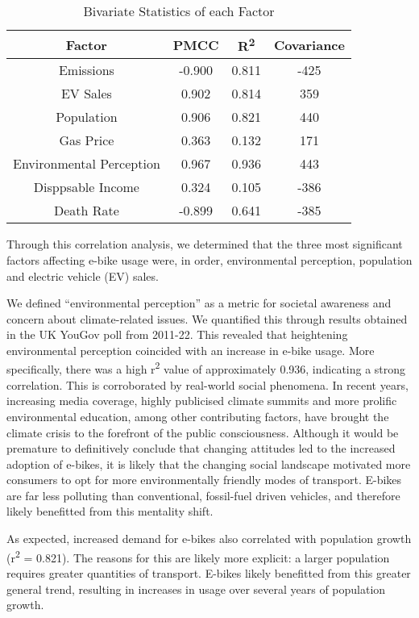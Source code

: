 \begin{table}[h!]
    \centering
    \caption{Bivariate Statistics of each Factor}
    \begin{tabular}{cccc}
        \toprule
        Factor & PMCC & R\textsuperscript{2} & Covariance      \\
        \midrule
        Emissions   & -0.900 & 0.811 & -425    \\
        EV Sales & 0.902 & 0.814 & 359     \\
        Population & 0.906 & 0.821 & 440 \\
        Gas Price & 0.363 & 0.132 & 171 \\
        Environmental Perception & 0.967 & 0.936 & 443 \\
        Disppsable Income & 0.324 & 0.105 & -386 \\
        Death Rate & -0.899 & 0.641 & -385 \\
        \bottomrule
    \end{tabular}
    \label{tab:factor_bivar}
\end{table}

Through this correlation analysis, we determined that the three most significant factors affecting e-bike usage were, in order, environmental perception, population and electric vehicle (EV) sales.

We defined ``environmental perception'' as a metric for societal awareness and concern about climate-related issues. We quantified this through results obtained in the UK YouGov poll from 2011-22. This revealed that heightening environmental perception coincided with an increase in e-bike usage. More specifically, there was a high r\textsuperscript{2} value of approximately 0.936, indicating a strong correlation. This is corroborated by real-world social phenomena. In recent years, increasing media coverage, highly publicised climate summits and more prolific environmental education, among other contributing factors, have brought the climate crisis to the forefront of the public consciousness. Although it would be premature to definitively conclude that changing attitudes led to the increased adoption of e-bikes, it is likely that the changing social landscape motivated more consumers to opt for more environmentally friendly modes of transport. E-bikes are far less polluting than conventional, fossil-fuel driven vehicles, and therefore likely benefitted from this mentality shift.

As expected, increased demand for e-bikes also correlated with population growth (r\textsuperscript{2} = 0.821). The reasons for this are likely more explicit: a larger population requires greater quantities of transport. E-bikes likely benefitted from this greater general trend, resulting in increases in usage over several years of population growth.

